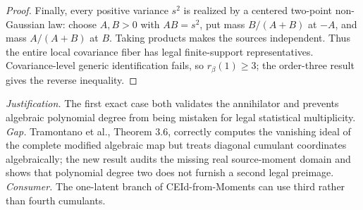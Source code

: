 \documentclass{article}
\begin{document}
\begin{proof}
Finally, every positive variance \(s^2\) is realized by a centered two-point non-Gaussian law: choose \(A,B>0\) with \(AB=s^2\), put mass \(B/(A+B)\) at \(-A\), and mass \(A/(A+B)\) at \(B\).  Taking products makes the sources independent.  Thus the entire local covariance fiber has legal finite-support representatives.  Covariance-level generic identification fails, so \(r_\beta(1)\ge3\); the order-three result gives the reverse inequality.
\end{proof}
\par\smallskip\noindent \textit{Justification.} The first exact case both validates the annihilator and prevents algebraic polynomial degree from being mistaken for legal statistical multiplicity. \textit{Gap.} Tramontano et al., Theorem 3.6, correctly computes the vanishing ideal of the complete modified algebraic map but treats diagonal cumulant coordinates algebraically; the new result audits the missing real source-moment domain and shows that polynomial degree two does not furnish a second legal preimage. \textit{Consumer.} The one-latent branch of CEId-from-Moments can use third rather than fourth cumulants.
\end{document}
